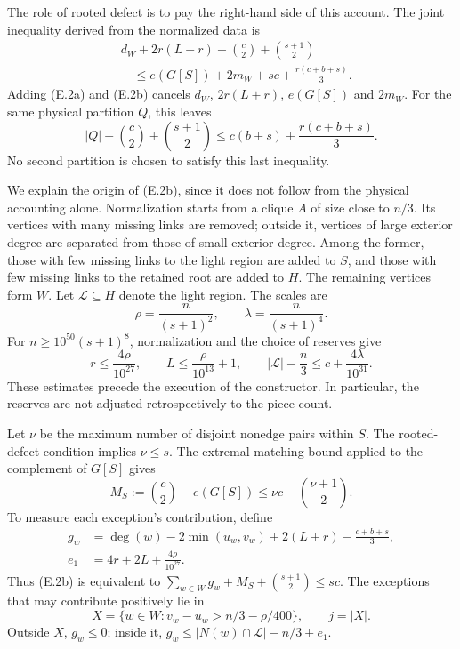 \documentclass[english,11pt,a4paper]{article}
\newcounter{none}
\begin{document}
The role of rooted defect is to pay the right-hand side of this account. The joint inequality derived from the normalized data is \[
\begin{split}
&d_W+2r(L+r)+\binom c2+\binom{s+1}2\\
&\hspace{1em}\le e(G[S])+2m_W+sc+\frac{r(c+b+s)}3.
\end{split}
\tag{E.2b}
\] Adding (E.2a) and (E.2b) cancels \(d_W\), \(2r(L+r)\), \(e(G[S])\) and \(2m_W\). For the same physical partition \(Q\), this leaves \[
|Q|+\binom c2+\binom{s+1}2
\le c(b+s)+\frac{r(c+b+s)}3.
\tag{E.2c}
\] No second partition is chosen to satisfy this last inequality.

We explain the origin of (E.2b), since it does not follow from the physical accounting alone. Normalization starts from a clique \(A\) of size close to \(n/3\). Its vertices with many missing links are removed; outside it, vertices of large exterior degree are separated from those of small exterior degree. Among the former, those with few missing links to the light region are added to \(S\), and those with few missing links to the retained root are added to \(H\). The remaining vertices form \(W\). Let \(\mathcal L\subseteq H\) denote the light region. The scales are \[
\rho=\frac{n}{(s+1)^2},\qquad \lambda=\frac{n}{(s+1)^4}.
\] For \(n\ge10^{50}(s+1)^8\), normalization and the choice of reserves give \[
r\le\frac{4\rho}{10^{27}},\qquad
L\le\frac{\rho}{10^{13}}+1,\qquad
|\mathcal L|-\frac n3\le c+\frac{4\lambda}{10^{31}}.
\] These estimates precede the execution of the constructor. In particular, the reserves are not adjusted retrospectively to the piece count.

Let \(\nu\) be the maximum number of disjoint nonedge pairs within \(S\). The rooted-defect condition implies \(\nu\le s\). The extremal matching bound applied to the complement of \(G[S]\) gives \[
M_S:=\binom c2-e(G[S])\le \nu c-\binom{\nu+1}2.
\] To measure each exception's contribution, define \[
\begin{split}
g_w&=\deg(w)-2\min(u_w,v_w)+2(L+r)-\frac{c+b+s}{3},\\
e_1&=4r+2L+\frac{4\rho}{10^{27}}.
\end{split}
\] Thus (E.2b) is equivalent to \(\sum_{w\in W}g_w+M_S+\binom{s+1}2\le sc\). The exceptions that may contribute positively lie in \[
X=\{w\in W:v_w-u_w>n/3-\rho/400\},\qquad j=|X|.
\] Outside \(X\), \(g_w\le0\); inside it, \(g_w\le |N(w)\cap\mathcal L|-n/3+e_1\).
\end{document}
